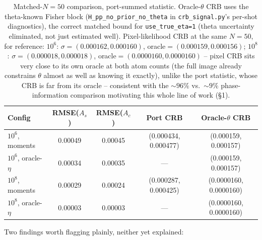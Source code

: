 \documentclass[11pt,a4paper]{article}
\begin{document}
\begin{table}[h]
\centering
\begin{tabular}{lcccc}
\toprule
Config & RMSE($A_s$) & RMSE($A_c$) & Port CRB & Oracle-$\theta$ CRB \\
\midrule
$10^6$, moments & 0.00049 & 0.00045 & (0.000434, 0.000477) & (0.000159, 0.000157) \\
$10^6$, oracle-$\eta$ & 0.00034 & 0.00035 & --- & (0.000159, 0.000157) \\
$10^8$, moments & 0.00029 & 0.00024 & (0.000287, 0.000425) & (0.0000160, 0.0000160) \\
$10^8$, oracle-$\eta$ & 0.00003 & 0.00003 & --- & (0.0000160, 0.0000160) \\
\bottomrule
\end{tabular}
\caption{Matched-$N{=}50$ comparison, port-summed statistic. Oracle-$\theta$
CRB uses the theta-known Fisher block (\texttt{H\_pp\_no\_prior\_no\_theta}
in \texttt{crb\_signal.py}'s per-shot diagnostics), the correct matched
bound for \texttt{use\_true\_eta=1} (theta uncertainty eliminated, not just
estimated well). Pixel-likelihood CRB at the same $N=50$, for reference:
$10^6$: $\sigma=(0.000162,0.000160)$, oracle$=(0.000159,0.000156)$;
$10^8$: $\sigma=(0.000018,0.000018)$, oracle$=(0.0000160,0.0000160)$ --
pixel CRB sits very close to its own oracle at both atom counts (the full
image already constrains $\theta$ almost as well as knowing it exactly),
unlike the port statistic, whose CRB is far from its oracle -- consistent
with the $\sim\!96\%$ vs.\ $\sim\!9\%$ phase-information comparison
motivating this whole line of work (\S1).}
\end{table}

Two findings worth flagging plainly, neither yet explained:
\end{document}
